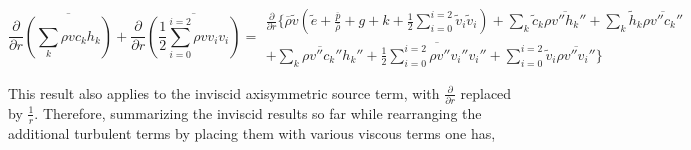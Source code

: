 \begin{displaymath}
	\frac{\partial}{\partial r}\overline{(\sum_{k}\rho v c_k h_k)} + \frac{\partial}{\partial r}
	\overline{(\frac{1}{2}\sum_{i=0}^{i=2}\rho v v_i v_i)} = 
	\begin{array}{c}
		\frac{\partial}{\partial r}\Big\{\overline{\rho}\tilde v(\tilde e + \frac{\overline{p}}{\overline{\rho}} 
		 + g + k + \frac{1}{2}\sum_{i=0}^{i=2}\tilde v_i \tilde v_i)
		+\sum_k \tilde c_k \overline{\rho v'' h_k''} + \sum_k \tilde h_k \overline{\rho v'' c_k''} \\
		 +\overline{\sum_k \rho v'' c_k'' h_k''} + \frac{1}{2}
		\overline{\sum_{i=0}^{i=2} \rho v'' v_i'' v_i''}  + \sum_{i=0}^{i=2}\tilde v_i \overline{\rho v'' v_i''}\Big\}
	\end{array}
\end{displaymath}

	This result also applies to the inviscid axisymmetric source term, with $\frac{\partial}{\partial r}$ replaced
by $\frac{1}{r}$.  Therefore, summarizing the inviscid results so far while rearranging the additional turbulent terms 
by placing them with various viscous terms one has,

